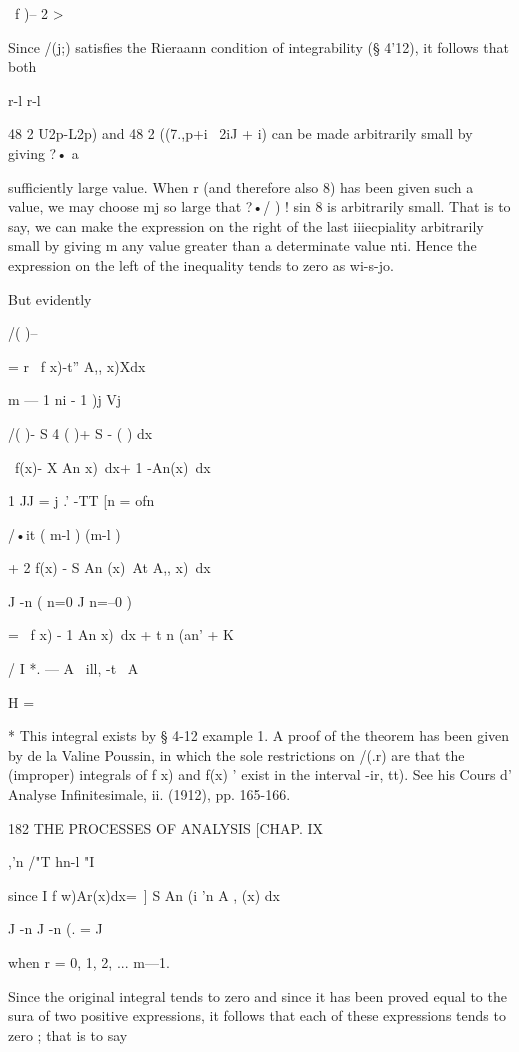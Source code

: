 \ f  )-- 2 >%

Since /(j;) satisfies the Rieraann condition of integrability (§ 4'12), it follows that both 

r-l r-l 

48 2  U2p-L2p) and 48 2 ((7.,p+i~   2iJ + i) can be made arbitrarily small by giving ?• a 

sufficiently large value. When r (and therefore also 8) has been given such a value, we 
may choose mj so large that ?•/ ) ! sin 8  is arbitrarily small. That is to say, we can 
make the expression on the right of the last iiiecpiality arbitrarily small by giving m any 
value greater than a determinate value nti. Hence the expression on the left of the 
inequality tends to zero as wi-s-jo. 

But evidently 

/( )-- %

= r \ f x)-t'' A,, x)Xdx 

m — 1 ni - 1 )j Vj 

/( )- S 4 ( )+ S -  ( ) dx 

\ f(x)- X An x)\ dx+ 1 -An(x)\ dx 

1 JJ = j .' -TT [n = ofn   

/•it ( m-l ) (m-l ) 

+ 2 f(x) - S An (x)\ At A,, x)\ dx 

J -n ( n=0 J  n=--0 ) 

= \ f x) - 1 An  x)\ dx +  t n  (an' + K  

/ I *. — A \ ill,  -t \  A 



H = 



* This integral exists by § 4-12 example 1. A proof of the theorem has been given by de la 
Valine Poussin, in which the sole restrictions on /(.r) are that the (improper) integrals of f  x) 
and  f(x) '  exist in the interval  -ir, tt). See his Cours d' Analyse Infinitesimale, ii. (1912), 
pp. 165-166. 



182 THE PROCESSES OF ANALYSIS [CHAP. IX 

,'n /"T hn-l "I 

since I f w)Ar(x)dx=\ ] S An (i 'n A , (x) dx 

J -n J -n (.  = J 

when r = 0, 1, 2, ... m—1. 

Since the original integral tends to zero and since it has been proved 
equal to the sura of two positive expressions, it follows that each of these 
expressions tends to zero ; that is to say 


